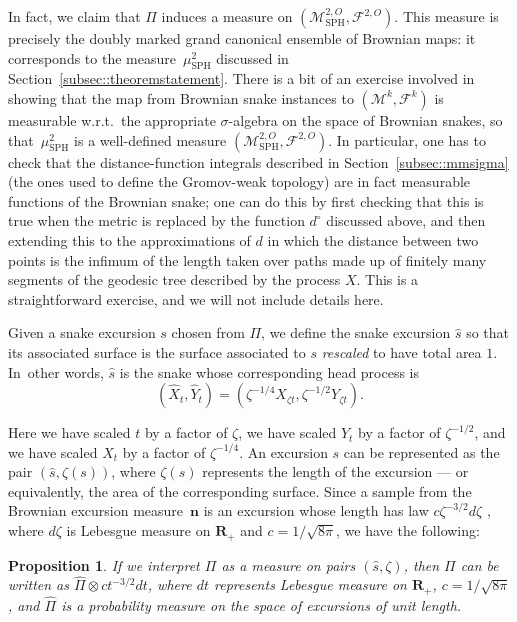 \documentclass[10pt]{amsart}
\let\mathcal\mathscr
\let\oldS\S
\theoremstyle{plain}
\numberwithin{theorem}{section}
\newtheorem{proposition}[theorem]{Proposition}
\theoremstyle{definition}
\newcommand\gmsspace{{\mathcal M}_{\mathrm{SPH}}}
\newcommand\mmspace{{\mathcal M}}
\newcommand\mmsigma{{\mathcal F}}
\newcommand{\R}{\mathbf{R}}
\renewcommand{\S}{{\mathbf S}}
\newcommand{\excursion}{{\boldsymbol n}}
\newcommand{\mustwo}{\mu_{\mathrm{SPH}}^2}
\let\wh\widehat
\let\snakeexcursionmeasure \Pi
\begin{document}
In fact, we claim that $\snakeexcursionmeasure$ induces a measure on $(\gmsspace^{2,O},\mmsigma^{2,O})$. This measure is precisely the doubly marked grand canonical ensemble of Brownian maps: \ie it corresponds to the measure~$\mustwo$ discussed in Section~\ref{subsec::theoremstatement}. There is a bit of an exercise involved in showing that the map from Brownian snake instances to $(\mmspace^k, \mmsigma^k)$ is measurable w.r.t.\ the appropriate $\sigma$-algebra on the space of Brownian snakes, so that~$\mustwo$ is a well-defined measure $(\gmsspace^{2,O},\mmsigma^{2,O})$. In particular, one has to check that the distance-function integrals described in Section~\ref{subsec::mmsigma} (the ones used to define the Gromov-weak topology) are in fact measurable functions of the Brownian snake; one can do this by first checking that this is true when the metric is replaced by the function $d^\circ$ discussed above, and then extending this to the approximations of $d$ in which the distance between two points is the infimum of the length taken over paths made up of finitely many segments of the geodesic tree described by the process $X$. This is a straightforward exercise, and we will not include details here.

Given a snake excursion $s$ chosen from $\snakeexcursionmeasure$, we define the snake excursion $\wh s$ so that its associated surface is the surface associated to $s$ \emph{rescaled} to have total area $1$. In~other words, $\wh s$ is the snake whose corresponding head process is\vspace*{-3pt}
\[
(\wh X_t, \wh Y_t) = (\zeta^{-1/4} X_{ \zeta t}, \zeta^{-1/2} Y_{\zeta t}).
\]

Here we have scaled $t$ by a factor of $\zeta$, we have scaled $Y_t$ by a factor of $\zeta^{-1/2}$, and we have scaled $X_t$ by a factor of $\zeta^{-1/4}$. An excursion $s$ can be represented as the pair $(\wh s, \zeta(s))$, where $\zeta(s)$ represents the length of the excursion --- or equivalently, the area of the corresponding surface. Since a sample from the Brownian excursion measure~$\excursion$ is an excursion whose length has law $c \zeta^{-3/2} d\zeta$ \cite[Chap.\,XII, \oldS 4]{ry99martingales}, where $d\zeta$ is Lebesgue measure on $\R_+$ and $c=1/\sqrt{8\pi}$, we have the following:

\begin{proposition}
\label{prop::bm_measures}
If we interpret $\snakeexcursionmeasure$ as a measure on pairs $(\wh s, \zeta)$, then $\snakeexcursionmeasure$ can be written as $\wh \snakeexcursionmeasure \otimes c t^{-3/2} dt$, where $dt$ represents Lebesgue measure on $\R_+$, $c=1/\sqrt{8\pi}$, and $\wh \snakeexcursionmeasure$ is a probability measure on the space of excursions of unit length.
\end{proposition}
\end{document}
